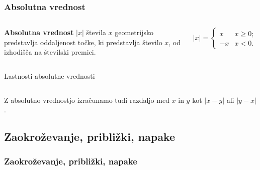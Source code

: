         \begin{frame}
            \frametitle{Absolutna vrednost}

            \begin{columns}
            
            \begin{alertblock}{}
                \textbf{Absolutna vrednost} $|x|$ števila $x$ geometrijsko predstavlja oddaljenost točke, 
                ki predstavlja število $x$, od izhodišča na številski premici.
            \end{alertblock}

            \begin{alertblock}{}
                $$|x|=\begin{cases} x &x\geq 0; \\ -x & x<0. \end{cases}$$
            \end{alertblock}

        \end{columns}


            \begin{block}{Lastnosti absolutne vrednosti}
                \begin{columns}
                    \end{columns}
    
            \end{block}

            \begin{block}{}
                Z absolutno vrednostjo izračunamo tudi razdaljo med $x$ in $y$ kot $|x-y|$ ali $|y-x|$.
            \end{block}
        \end{frame}

    \subsection{Zaokroževanje, približki, napake}

        \begin{frame}
            \frametitle{Zaokroževanje, približki, napake}
        \end{frame}

   